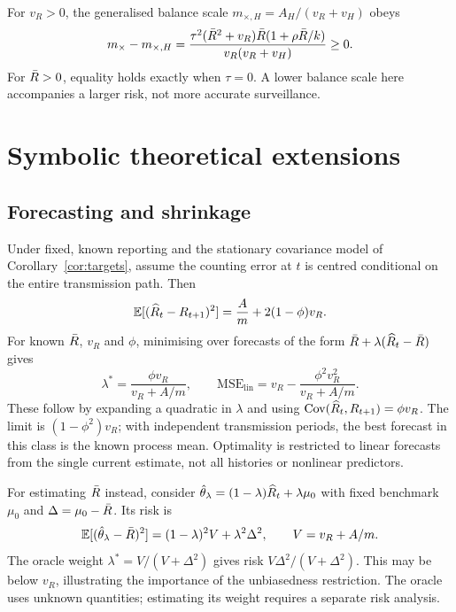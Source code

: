 For $v_R>0$, the generalised balance scale $m_{\times,H}=A_H/(v_R+v_H)$ obeys
\begin{equation}
 m_{\times}-m_{\times,H}
 =\frac{\tau^2(\bar R^2+v_R)\bar R(1+\rho\bar R/k)}{v_R(v_R+v_H)}\ge0.
 \label{eq:mx-gap}
\end{equation}
For $\bar R>0$, equality holds exactly when $\tau=0$. A lower balance scale here accompanies a larger risk, not more accurate surveillance.

\section{Symbolic theoretical extensions}
\label{app:extensions}

\subsection{Forecasting and shrinkage}
\label{app:forecast}
\label{app:shrinkage}

Under fixed, known reporting and the stationary covariance model of Corollary~\ref{cor:targets}, assume the counting error at $t$ is centred conditional on the entire transmission path. Then
\begin{equation}
 \mathbb{E}[(\widehat R_t-R_{t+1})^2]=\frac{A}{m}+2(1-\phi)v_R.
\end{equation}
For known $\bar R$, $v_R$ and $\phi$, minimising over forecasts of the form $\bar R+\lambda(\widehat R_t-\bar R)$ gives
\begin{equation}
 \lambda^*=\frac{\phi v_R}{v_R+A/m},\qquad
 \mathrm{MSE}_{\mathrm{lin}}=v_R-\frac{\phi^2v_R^2}{v_R+A/m}.
 \label{eq:forecast}
\end{equation}
These follow by expanding a quadratic in $\lambda$ and using $\mathrm{Cov}(\widehat R_t,R_{t+1})=\phi v_R$. The limit is $(1-\phi^2)v_R$; with independent transmission periods, the best forecast in this class is the known process mean. Optimality is restricted to linear forecasts from the single current estimate, not all histories or nonlinear predictors.

For estimating $\bar R$ instead, consider $\hat\theta_\lambda=(1-\lambda)\widehat R_t+\lambda\mu_0$ with fixed benchmark $\mu_0$ and $\Delta=\mu_0-\bar R$. Its risk is
\begin{equation}
 \mathbb{E}[(\hat\theta_\lambda-\bar R)^2]=(1-\lambda)^2V+\lambda^2\Delta^2,
 \qquad V=v_R+A/m.
\end{equation}
The oracle weight $\lambda^*=V/(V+\Delta^2)$ gives risk $V\Delta^2/(V+\Delta^2)$. This may be below $v_R$, illustrating the importance of the unbiasedness restriction. The oracle uses unknown quantities; estimating its weight requires a separate risk analysis.

